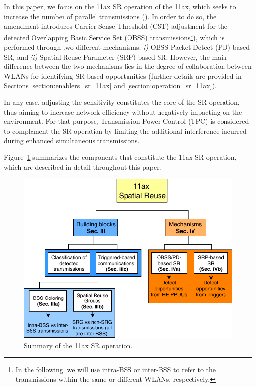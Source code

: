 \documentclass[preprint,12pt]{elsarticle}
\begin{document}
	In this paper, we focus on the 11ax SR operation of the 11ax, which seeks to increase the number of parallel transmissions (\citealp{merlin2009methods}). In order to do so, the amendment introduces Carrier Sense Threshold (CST) adjustment for the detected Overlapping Basic Service Set (OBSS) transmissions\footnote{In the following, we will use intra-BSS or inter-BSS to refer to the transmissions within the same or different WLANs, respectively.}), which is performed through two different mechanisms: \emph{i)} OBSS Packet Detect (PD)-based SR, and \emph{ii)} Spatial Reuse Parameter (SRP)-based SR. However, the main difference between the two mechanisms lies in the degree of collaboration between WLANs for identifying SR-based opportunities (further details are provided in Sections \ref{section:enablers_sr_11ax} and \ref{section:operation_sr_11ax}).
	
	In any case, adjusting the sensitivity constitutes the core of the SR operation, thus aiming to increase network efficiency without negatively impacting on the environment. For that purpose, Transmission Power Control (TPC) is considered to complement the SR operation by limiting the additional interference incurred during enhanced simultaneous transmissions. 
	
	Figure~\ref{fig:sr_summary} summarizes the components that constitute the 11ax SR operation, which are described in detail throughout this paper.
	
	\begin{figure}[ht!]
		\centering
		\includegraphics[width=0.5\columnwidth]{sr_summary}
		\caption{Summary of the 11ax SR operation.}
		\label{fig:sr_summary}
	\end{figure}
	
\end{document}
